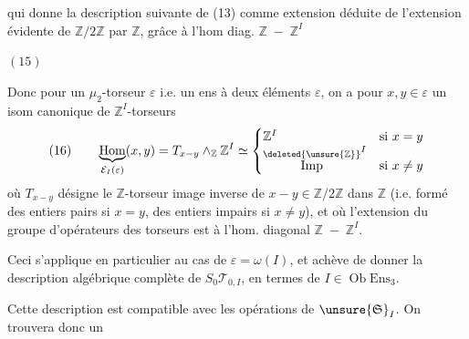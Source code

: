 qui donne la description suivante de (13) comme extension déduite de l'extension évidente de  $\mathbb Z/2\mathbb Z$ par $\mathbb Z$, grâce à l'hom diag. $\mathbb Z\;-\;\mathbb Z^I$

$(15)$\quad
{}

Donc pour un $\mu_2$-torseur $\varepsilon$ i.e. un ens à deux éléments $\varepsilon$, on a pour $x,y\in\varepsilon$ un isom canonique de $\mathbb Z^I$-torseurs
\[
(16)\qquad\underbrace{\operatorname{Hom}}_{\mathcal E_I(\varepsilon)}(x,y)
=T_{x-y}\wedge_{\mathbb Z}\mathbb Z^I\simeq
\begin{cases}
\mathbb Z^I&\text{si }x=y\\
\overset{\deleted{\unsure{\mathbb Z}}}{\mathrm{Imp}}^I&\text{si }x\ne y
\end{cases}
\]
où  $T_{x-y}$ désigne le $\mathbb Z$-torseur image inverse de $x-y\in\mathbb Z/2\mathbb Z$ dans $\mathbb Z$ (i.e. formé des entiers pairs si $x=y$, des entiers impairs si $x\ne y$), et où l'extension du groupe d'opérateurs des torseurs est  à l'hom. diagonal $\mathbb Z\;-\;\mathbb Z^I$.

Ceci s'applique en particulier au cas de $\varepsilon=\omega(I)$, et achève de donner la description algébrique complète de $S_0\mathcal T_{0,I}$, en termes de $I\in\operatorname{Ob}\mathrm{Ens}_3$.

Cette description est compatible avec les opérations de $\unsure{\mathfrak S}_I$. On trouvera donc un

